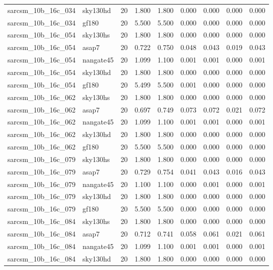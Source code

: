 \begin{tabular}{llrrrrrrr}
sarcsm\_10b\_16c\_034 & sky130hd & 20 & 1.800 & 1.800 & 0.000 & 0.000 & 0.000 & 0.000 \\
sarcsm\_10b\_16c\_034 & gf180 & 20 & 5.500 & 5.500 & 0.000 & 0.000 & 0.000 & 0.000 \\
sarcsm\_10b\_16c\_054 & sky130hs & 20 & 1.800 & 1.800 & 0.000 & 0.000 & 0.000 & 0.000 \\
sarcsm\_10b\_16c\_054 & asap7 & 20 & 0.722 & 0.750 & 0.048 & 0.043 & 0.019 & 0.043 \\
sarcsm\_10b\_16c\_054 & nangate45 & 20 & 1.099 & 1.100 & 0.001 & 0.001 & 0.000 & 0.001 \\
sarcsm\_10b\_16c\_054 & sky130hd & 20 & 1.800 & 1.800 & 0.000 & 0.000 & 0.000 & 0.000 \\
sarcsm\_10b\_16c\_054 & gf180 & 20 & 5.499 & 5.500 & 0.001 & 0.000 & 0.000 & 0.000 \\
sarcsm\_10b\_16c\_062 & sky130hs & 20 & 1.800 & 1.800 & 0.000 & 0.000 & 0.000 & 0.000 \\
sarcsm\_10b\_16c\_062 & asap7 & 20 & 0.697 & 0.749 & 0.073 & 0.072 & 0.021 & 0.072 \\
sarcsm\_10b\_16c\_062 & nangate45 & 20 & 1.099 & 1.100 & 0.001 & 0.001 & 0.000 & 0.001 \\
sarcsm\_10b\_16c\_062 & sky130hd & 20 & 1.800 & 1.800 & 0.000 & 0.000 & 0.000 & 0.000 \\
sarcsm\_10b\_16c\_062 & gf180 & 20 & 5.500 & 5.500 & 0.000 & 0.000 & 0.000 & 0.000 \\
sarcsm\_10b\_16c\_079 & sky130hs & 20 & 1.800 & 1.800 & 0.000 & 0.000 & 0.000 & 0.000 \\
sarcsm\_10b\_16c\_079 & asap7 & 20 & 0.729 & 0.754 & 0.041 & 0.043 & 0.016 & 0.043 \\
sarcsm\_10b\_16c\_079 & nangate45 & 20 & 1.100 & 1.100 & 0.000 & 0.001 & 0.000 & 0.001 \\
sarcsm\_10b\_16c\_079 & sky130hd & 20 & 1.800 & 1.800 & 0.000 & 0.000 & 0.000 & 0.000 \\
sarcsm\_10b\_16c\_079 & gf180 & 20 & 5.500 & 5.500 & 0.000 & 0.000 & 0.000 & 0.000 \\
sarcsm\_10b\_16c\_084 & sky130hs & 20 & 1.800 & 1.800 & 0.000 & 0.000 & 0.000 & 0.000 \\
sarcsm\_10b\_16c\_084 & asap7 & 20 & 0.712 & 0.741 & 0.058 & 0.061 & 0.021 & 0.061 \\
sarcsm\_10b\_16c\_084 & nangate45 & 20 & 1.099 & 1.100 & 0.001 & 0.001 & 0.000 & 0.001 \\
sarcsm\_10b\_16c\_084 & sky130hd & 20 & 1.800 & 1.800 & 0.000 & 0.000 & 0.000 & 0.000 \\

\end{tabular}
